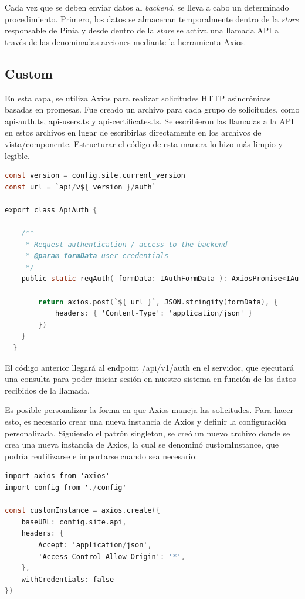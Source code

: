 Cada vez que se deben enviar datos al \textit{backend}, se lleva a cabo un determinado procedimiento. Primero, los datos se almacenan temporalmente dentro de la \textit{store} responsable de Pinia y desde dentro de la \textit{store} se activa una llamada API a través de las denominadas acciones mediante la herramienta Axios.

\subsection{Custom}
En esta capa, se utiliza Axios para realizar solicitudes HTTP asincrónicas basadas en promesas. Fue creado un archivo para cada grupo de solicitudes, como api-auth.ts, api-users.ts y api-certificates.ts. Se escribieron las llamadas a la API en estos archivos en lugar de escribirlas directamente en los archivos de vista/componente. Estructurar el código de esta manera lo hizo más limpio y legible.

\begin{lstlisting}[language=C,caption={Ejemplo de una solicitud al servidor usando axios}, label={lst:axios}]
const version = config.site.current_version
const url = `api/v${ version }/auth`

export class ApiAuth {

    /**
     * Request authentication / access to the backend
     * @param formData user credentials
     */
    public static reqAuth( formData: IAuthFormData ): AxiosPromise<IAuthResponse> {

        return axios.post(`${ url }`, JSON.stringify(formData), {
            headers: { 'Content-Type': 'application/json' }
        })
    }
  }
\end{lstlisting}

El código anterior llegará al endpoint /api/v1/auth en el servidor, que ejecutará una consulta para poder iniciar sesión en nuestro sistema en función de los datos recibidos de la llamada.

Es posible personalizar la forma en que Axios maneja las solicitudes. Para hacer esto, es necesario crear una nueva instancia de Axios y definir la configuración personalizada. Siguiendo el patrón singleton, se creó un nuevo archivo donde se crea una nueva instancia de Axios, la cual se denominó customInstance, que podría reutilizarse e importarse cuando sea necesario:

\begin{lstlisting}[language=C,caption={Instancia única de Axios}, label={lst:axios1}]
import axios from 'axios'
import config from './config'

const customInstance = axios.create({
    baseURL: config.site.api,
    headers: {
        Accept: 'application/json',
        'Access-Control-Allow-Origin': '*',
    },
    withCredentials: false
})
\end{lstlisting}

